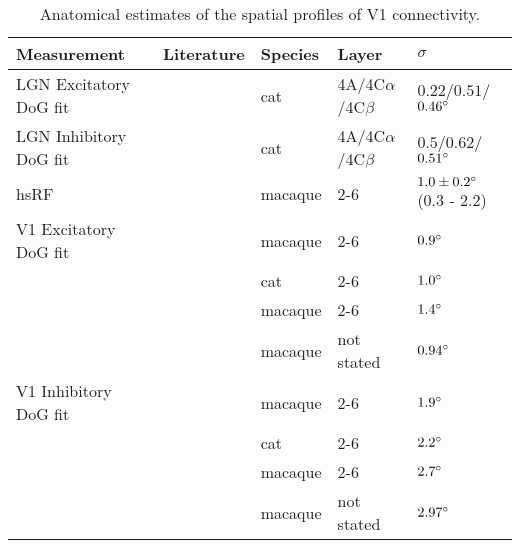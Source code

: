 \documentclass[12pt]{article}
\begin{document}
\begin{table}
  \centering
  \begin{tabular}{l | l l l l}
    Measurement              & Literature            & Species & Layer & $\sigma$ \\
    \hline
    LGN Excitatory DoG fit   & \cite{Sceniak2006}    & cat     & 4A/4C$\alpha$/4C$\beta$ & $0.22$/$0.51$/$0.46\degree$ \\
    LGN Inhibitory DoG fit   & \cite{Sceniak2006}    & cat     & 4A/4C$\alpha$/4C$\beta$ & $0.5$/$0.62$/$0.51\degree$ \\
    \hline
    hsRF                     & \cite{Levitt2002}     & macaque & 2-6 & $1.0 \pm 0.2 \degree$ (0.3 - 2.2) \\
    \hline
    V1 Excitatory DoG fit    & \cite{Levitt2002}     & macaque & 2-6 & $0.9 \degree$ \\
                             & \cite{Sceniak2001}    & cat     & 2-6 & $1.0 \degree$ \\
                             & \cite{Cavanaugh2002}  & macaque & 2-6 & $1.4 \degree$ \\
                             & \cite{Solomon2004}    & macaque & not stated & $0.94 \degree$ \\
    \hline
    V1 Inhibitory DoG fit    & \cite{Levitt2002}     & macaque & 2-6 & $1.9 \degree$ \\
                             & \cite{Sceniak2001}    & cat     & 2-6 & $2.2 \degree$ \\
                             & \cite{Cavanaugh2002}  & macaque & 2-6 & $2.7 \degree$ \\
                             & \cite{Solomon2004}    & macaque & not stated & $2.97 \degree$ \\
    
    \hline
  \end{tabular}
  \caption[]%
          {Anatomical estimates of the spatial profiles of V1 connectivity.}
  \label{anatomicaltable}
\end{table}



\end{document}
